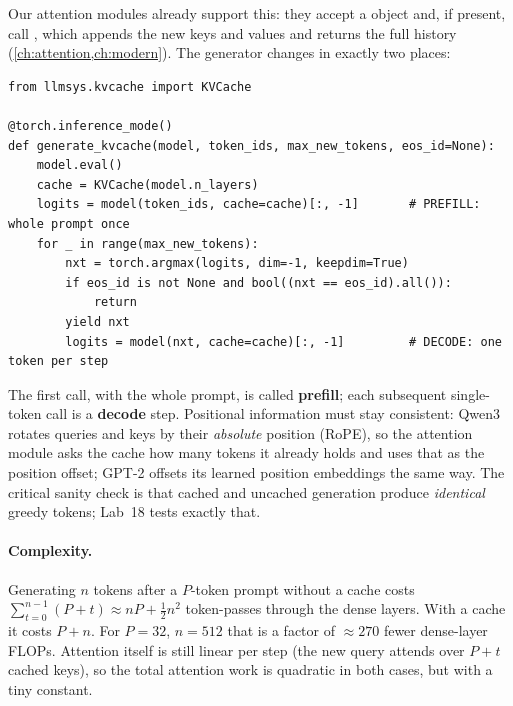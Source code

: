 Our attention modules already support this: they accept a  object and, if present,
call , which appends the new keys and values and returns
the full history (\cref{ch:attention,ch:modern}). The generator changes in exactly two places:

\begin{lstlisting}[caption={Greedy generation with a KV cache (Lab 18, Task 2).},label={lst:inference:cache}]
from llmsys.kvcache import KVCache

@torch.inference_mode()
def generate_kvcache(model, token_ids, max_new_tokens, eos_id=None):
    model.eval()
    cache = KVCache(model.n_layers)
    logits = model(token_ids, cache=cache)[:, -1]       # PREFILL: whole prompt once
    for _ in range(max_new_tokens):
        nxt = torch.argmax(logits, dim=-1, keepdim=True)
        if eos_id is not None and bool((nxt == eos_id).all()):
            return
        yield nxt
        logits = model(nxt, cache=cache)[:, -1]         # DECODE: one token per step
\end{lstlisting}

The first call, with the whole prompt, is called \textbf{prefill}; each subsequent single-token
call is a \textbf{decode} step. Positional information must stay consistent: Qwen3 rotates queries
and keys by their \emph{absolute} position (RoPE), so the attention module asks the cache how many
tokens it already holds and uses that as the position offset; GPT-2 offsets its learned position
embeddings the same way. The critical sanity check is that cached and uncached generation produce
\emph{identical} greedy tokens; Lab~18 tests exactly that.

\paragraph{Complexity.} Generating $n$ tokens after a $P$-token prompt without a cache costs
$\sum_{t=0}^{n-1}(P+t)\approx nP+\tfrac{1}{2}n^2$ token-passes through the dense layers. With a
cache it costs $P+n$. For $P=32$, $n=512$ that is a factor of $\approx270$ fewer dense-layer FLOPs.
Attention itself is still linear per step (the new query attends over $P+t$ cached keys), so the
total attention work is quadratic in both cases, but with a tiny constant.

